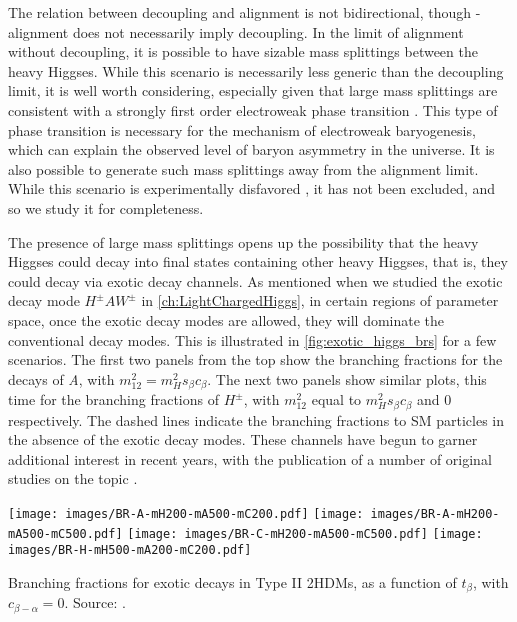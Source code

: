The relation between decoupling and alignment is not bidirectional, though - alignment does not necessarily imply decoupling. In the limit of alignment without decoupling, it is possible to have sizable mass splittings between the heavy Higgses. While this scenario is necessarily less generic than the decoupling limit, it is well worth considering, especially given that large mass splittings are consistent with a strongly first order electroweak phase transition \cite{Dorsch:2014qja}. This type of phase transition is necessary for the mechanism of electroweak baryogenesis, which can explain the observed level of baryon asymmetry in the universe. It is also possible to generate such mass splittings away from the alignment limit. While this scenario is experimentally disfavored \cite{Aad:2015pla}, it has not been excluded, and so we study it for completeness.

The presence of large mass splittings opens up the possibility that the heavy Higgses could decay into final states containing other heavy Higgses, that is, they could decay via exotic decay channels. As mentioned when we studied the exotic decay mode $H^\pm AW^\pm$ in \autoref{ch:LightChargedHiggs}, in certain regions of parameter space, once the exotic decay modes are allowed, they will dominate the conventional decay modes. This is illustrated in \autoref{fig:exotic_higgs_brs} for a few scenarios. The first two panels from the top show the branching fractions for the decays of \emph{A}, with $m_{12}^2 = m_H^2 s_\beta c_\beta$. The next two panels show similar plots, this time for the branching fractions of $H^\pm$, with $m_{12}^2$ equal to $m_H^2 s_\beta c_\beta$ and $0$ respectively. The dashed lines indicate the branching fractions to SM particles in the absence of the exotic decay modes. These channels have begun to garner additional interest in recent years, with the publication of a number of original studies on the topic \cite{Dorsch:2014qja,Dorsch:2016tab,Coleppa2013a,Coleppa2014a,Brownson:2013lka,Coleppa:2014cca,Kling2015c,Li:2015lra,Maitra:2014qea,Basso:2012st,Dermisek:2013cxa,Mohn:2005lda,Assamagan:2000ud}. 

\begin{marginfigure}[1cm]
  \centering
  \texttt{[image: images/BR-A-mH200-mA500-mC200.pdf]}
  \texttt{[image: images/BR-A-mH200-mA500-mC500.pdf]}
  \texttt{[image: images/BR-C-mH200-mA500-mC500.pdf]}
  \texttt{[image: images/BR-H-mH500-mA200-mC200.pdf]}
  \caption{Branching fractions for exotic decays in Type II 2HDMs, as a function of $t_\beta$, with $c_{\beta-\alpha} = 0$. Source: \cite{Kling2016}.}
\label{fig:exotic_higgs_brs}
\end{marginfigure}

